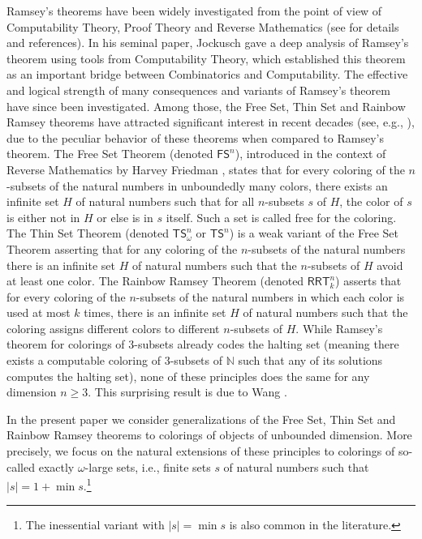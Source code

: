 \documentclass{article}
\newcommand{\RRT}[0]{\mathsf{RRT}}
\newcommand{\FS}[0]{\mathsf{FS}}
\newcommand{\TS}[0]{\mathsf{TS}}
\newcommand{\NN}[0]{\mathbb{N}}
\numberwithin{theorem}{section}
\begin{document}
Ramsey's theorems have been widely investigated from the point of view of Computability Theory, Proof Theory and Reverse Mathematics (see \cite{hirschfeldt2015slicing} for details and references).
In his seminal paper, Jockusch \cite{JockuschRamsey_1972} gave a deep analysis of Ramsey's theorem using tools from Computability Theory, which established this theorem as an important bridge between Combinatorics and Computability.
The effective and logical strength of many consequences and variants of Ramsey's theorem have since been investigated. Among those, the Free Set, Thin Set and Rainbow Ramsey theorems have attracted significant interest in recent decades (see, e.g., \cite{Cholak_Giusto_Hirst_Jockusch_2005, wang2014some, Pat:16, cholak2020thin, Liu2022-LIUTRM}), due to the peculiar behavior of these theorems when compared to Ramsey's theorem.
The Free Set Theorem (denoted $\FS^n$), introduced in the context of Reverse Mathematics by Harvey Friedman \cite{Fri-Sim:00}, states that for every coloring of the $n$-subsets of the natural numbers in unboundedly many colors, there exists an infinite set $H$ of natural numbers such that for all $n$-subsets $s$ of $H$, the color of $s$ is either not in $H$ or else is in $s$ itself. Such a set is called free for the coloring. The Thin Set Theorem (denoted $\TS^n_\omega$ or $\TS^n$) is a weak variant of the Free Set Theorem asserting that for any coloring of the $n$-subsets of the natural numbers there is an infinite set $H$ of natural numbers such that the $n$-subsets of $H$ avoid at least one color. The Rainbow Ramsey Theorem (denoted $\RRT^n_k$) asserts that for every coloring of the $n$-subsets of the natural numbers in which each color is used at most $k$ times, there is an infinite set $H$ of natural numbers such that the coloring assigns different colors to different $n$-subsets of $H$. 
While Ramsey's theorem for colorings of $3$-subsets already codes the halting set (meaning there exists a computable coloring of $3$-subsets of $\NN$ such that any of its solutions computes the halting set), none of these principles does the same for any dimension $n\geq 3$. This surprising result is due to Wang \cite{wang2014some}. 

In the present paper we consider generalizations of the Free Set, Thin Set and Rainbow Ramsey theorems to colorings of objects of unbounded dimension. More precisely, we focus on the natural extensions of these principles to colorings of so-called exactly $\omega$-large sets, i.e., finite sets $s$ of natural numbers such that $|s|=1+\min s$.\footnote{The inessential variant with $|s|=\min s$ is also common in the literature.} 
\end{document}
